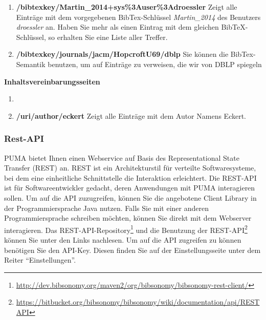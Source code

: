 \begin{enumerate}
    \item \textbf{/bibtexkey/Martin\_2014+sys\%3Auser\%3Adroessler} \newline
    Zeigt alle Einträge mit dem vorgegebenen BibTex-Schlüssel \textit{Martin\_2014} des Benutzers \textit{droessler} an. Haben Sie mehr als einen Eintrag mit dem gleichen BibTeX-Schlüssel, so erhalten Sie eine Liste aller Treffer.
    \item \textbf{/bibtexkey/journals/jacm/HopcroftU69/dblp} \newline
    Sie können die BibTex-Semantik benutzen, um auf Einträge zu verweisen, die wir von DBLP spiegeln  %
\end{enumerate}

\textbf{Inhaltsvereinbarungsseiten}
\begin{enumerate}
    \item 
    \item \textbf{/uri/author/eckert} \newline
    Zeigt alle Einträge mit dem Autor Namens Eckert.
\end{enumerate}

\subsubsection{Rest-API}
PUMA bietet Ihnen einen Webservice auf Basis des Representational State Transfer (REST) an. REST ist ein Architekturstil für verteilte Softwaresysteme, bei dem eine einheitliche Schnittstelle die Interaktion erleichtert. \newline
Die REST-API ist für Softwareentwickler gedacht, deren Anwendungen mit PUMA interagieren sollen. Um auf die API zuzugreifen, können Sie die angebotene Client Library in der Programmiersprache Java nutzen. Falls Sie mit einer anderen Programmiersprache schreiben möchten, können Sie direkt mit dem Webserver interagieren.\newline
Das REST-API-Repository\footnote{\url{http://dev.bibsonomy.org/maven2/org/bibsonomy/bibsonomy-rest-client/}} und die Benutzung der REST-API\footnote{\url{https://bitbucket.org/bibsonomy/bibsonomy/wiki/documentation/api/REST API}} können Sie unter den Links nachlesen.
\newline
\newline
Um auf die API zugreifen zu können benötigen Sie den API-Key. Diesen finden Sie auf der Einstellungsseite unter dem Reiter \enquote{Einstellungen}. 




